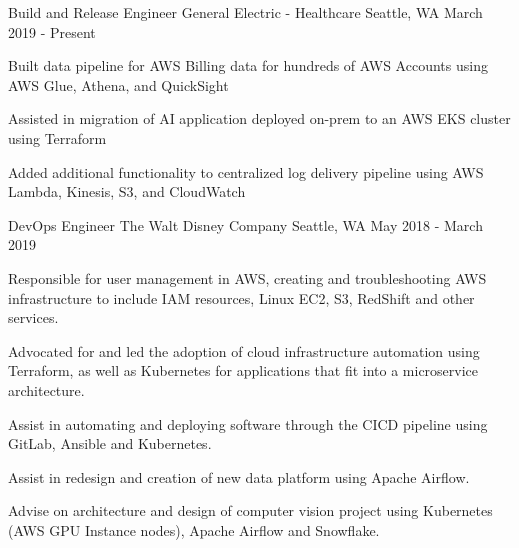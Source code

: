 

\begin{cventries}

  \cventry
    {Build and Release Engineer} %
    {General Electric - Healthcare} %
    {Seattle, WA} %
    {March 2019 - Present} %
    {
      \begin{cvitems} %
        \item {Built data pipeline for AWS Billing data for hundreds of AWS Accounts using AWS Glue, Athena, and QuickSight}
        \item {Assisted in migration of AI application deployed on-prem to an AWS EKS cluster using Terraform}
        \item {Added additional functionality to centralized log delivery pipeline using AWS Lambda, Kinesis, S3, and CloudWatch}
      \end{cvitems}
    }

  \cventry
    {DevOps Engineer} %
    {The Walt Disney Company} %
    {Seattle, WA} %
    {May 2018 - March 2019} %
    {
      \begin{cvitems} %
        \item {Responsible for user management in AWS, creating and troubleshooting AWS infrastructure to include IAM resources, Linux EC2, S3, RedShift and other services.}
        \item {Advocated for and led the adoption of cloud infrastructure automation using Terraform, as well as Kubernetes for applications that fit into a microservice architecture.}
        \item {Assist in automating and deploying software through the CICD pipeline using GitLab, Ansible and Kubernetes.}
        \item {Assist in redesign and creation of new data platform using Apache Airflow.}
        \item {Advise on architecture and design of computer vision project using Kubernetes (AWS GPU Instance nodes), Apache Airflow and Snowflake.}
      \end{cvitems}
    }


\end{cventries}
